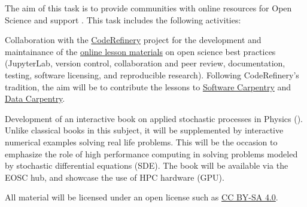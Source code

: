 \begin{task}[
  title=Online resources for reproducible science,
  id=online-resources,
  lead=UIO,
  PM=14,
  wphases={0-36!.3},
  partners={SRL,MP,UIO}
]
  The aim of this task is to provide communities with online resources for Open Science and support .
  This task includes the following activities:
  \begin{compactitem}
  \item Collaboration with the \href{https://coderefinery.org}{CodeRefinery} project for the development and maintainance of the \href{https://coderefinery.org/lessons/}{online lesson materials} on open science best practices (JupyterLab, version control, collaboration and peer review, documentation, testing, software licensing, and reproducible research).
    Following CodeRefinery's tradition, the aim will be to contribute the
    lessons to \href{https://software-carpentry.org/}{Software Carpentry}
    and \href{https://data-carpentry.org/}{Data Carpentry}.
\item Development of an interactive book on applied stochastic
  processes in Physics (). Unlike classical
  books in this subject, it will be supplemented by interactive
  numerical examples solving real life problems. This will be the
  occasion to emphasize the role of high performance computing in
  solving problems modeled by stochastic differential equations (SDE).
  The book will be available via the EOSC hub, and showcase the use of
  HPC hardware (GPU).
  \end{compactitem}
  All material will be licensed under an open license such as
  \href{https://creativecommons.org/licenses/by-sa/4.0/}{CC BY-SA 4.0}.
\end{task}
